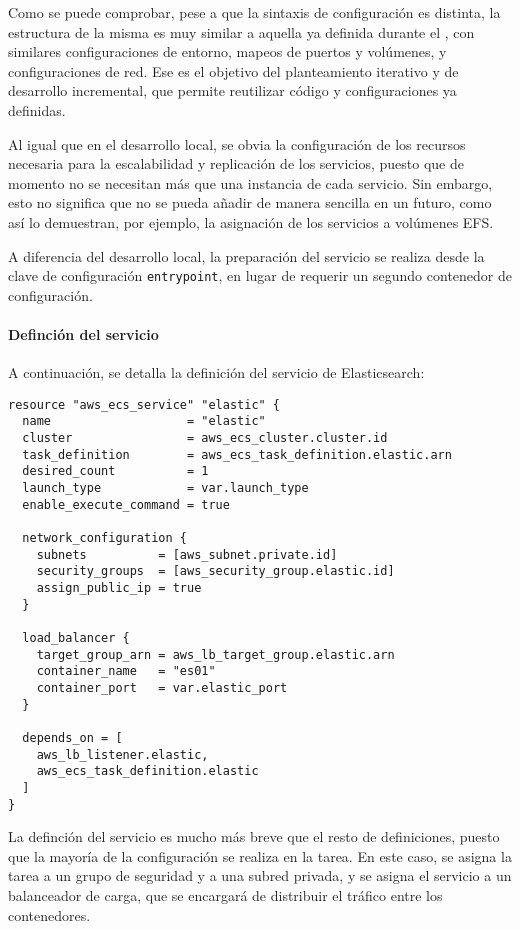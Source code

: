 Como se puede comprobar, pese a que la sintaxis de configuración es distinta,
la estructura de la misma es muy similar a aquella ya definida durante el
, con similares configuraciones de entorno, mapeos de
puertos y volúmenes, y configuraciones de red. Ese es el objetivo del
planteamiento iterativo y de desarrollo incremental, que permite reutilizar
código y configuraciones ya definidas.

Al igual que en el desarrollo local, se obvia la configuración de los recursos
necesaria para la escalabilidad y replicación de los servicios, puesto que de
momento no se necesitan más que una instancia de cada servicio. Sin embargo,
esto no significa que no se pueda añadir de manera sencilla en un futuro, como
así lo demuestran, por ejemplo, la asignación de los servicios a volúmenes EFS.

A diferencia del desarrollo local, la preparación del servicio se realiza desde
la clave de configuración \texttt{entrypoint}, en lugar de requerir un segundo
contenedor de configuración.


\newpage{}
\paragraph{Definción del servicio}
A continuación, se detalla la definición del servicio de Elasticsearch:

\begin{lstlisting}[caption={Definción del servicio de Elastic}, label={lst:elastic_service}]
	resource "aws_ecs_service" "elastic" {
  name                   = "elastic"
  cluster                = aws_ecs_cluster.cluster.id
  task_definition        = aws_ecs_task_definition.elastic.arn
  desired_count          = 1
  launch_type            = var.launch_type
  enable_execute_command = true

  network_configuration {
    subnets          = [aws_subnet.private.id]
    security_groups  = [aws_security_group.elastic.id]
    assign_public_ip = true
  }

  load_balancer {
    target_group_arn = aws_lb_target_group.elastic.arn
    container_name   = "es01"
    container_port   = var.elastic_port
  }

  depends_on = [
    aws_lb_listener.elastic,
    aws_ecs_task_definition.elastic
  ]
}
\end{lstlisting}

La definción del servicio es mucho más breve que el resto de definiciones,
puesto que la mayoría de la configuración se realiza en la tarea. En este caso,
se asigna la tarea a un grupo de seguridad y a una subred privada, y se asigna
el servicio a un balanceador de carga, que se encargará de distribuir el tráfico
entre los contenedores.


